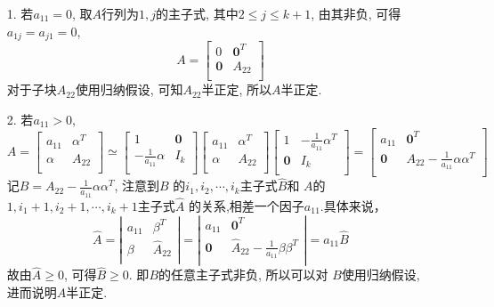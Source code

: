 \begin{enumerate}
	\item [1.] 若$a_{11} = 0$, 取$A$行列为$1,j$的主子式, 其中$2\le j \le k+1$,
	由其非负, 可得$a_{1j} = a_{j1} = 0$,
	\begin{equation}
	\nonumber
	A = \begin{bmatrix}
		0& \mathbf{0}^T\\
		\mathbf{0}& A_{22}\\
	\end{bmatrix}
	\end{equation}
	对于子块$A_{22}$使用归纳假设, 可知$A_{22}$半正定, 所以$A$半正定.
	\item [2.] 若$a_{11} > 0$,
	\begin{equation}
	\nonumber
	A=\begin{bmatrix}
		a_{11}& \alpha^T\\
		\alpha & A_{22}\\
	\end{bmatrix}
	\simeq 
	\begin{bmatrix}
		1& \mathbf{0}\\
		-\frac{1}{a_{11}}\alpha& I_{k}\\
	\end{bmatrix}
	\begin{bmatrix}
		a_{11}& \alpha^T\\
		\alpha & A_{22}\\
	\end{bmatrix}
	\begin{bmatrix}
		1& -\frac{1}{a_{11}}\alpha^T\\
		\mathbf{0}& I_{k}\\
	\end{bmatrix}
	=
	\begin{bmatrix}
		a_{11}& \mathbf{0}^T\\
		\mathbf{0} & A_{22} - \frac{1}{a_{11}}\alpha \alpha^T \\
	\end{bmatrix}
	\end{equation}
	记$B = A_{22} - \frac{1}{a_{11}}\alpha \alpha^T$,
	注意到$B$
	的$i_1,i_2,\cdots, i_k$主子式$\hat{B}$和
	$A$的$1,i_1+1,i_2+1,\cdots, i_k+1$主子式$\hat{A}$
	的关系,相差一个因子$a_{11}$.具体来说，
	\begin{equation}
	\nonumber
	\hat{A}=
	\left|
	\begin{array}{cc}
		a_{11}& \beta^T\\
		\beta& \hat{A}_{22}\\
	\end{array}
	\right|
	=
	\left|
	\begin{array}{cc}
		a_{11}& \mathbf{0}^T\\
		\mathbf{0} & \hat{A}_{22}-\frac{1}{a_{11}}\beta \beta^T \\
	\end{array}
	\right| = a_{11}\hat{B}
	\end{equation}
	故由$\hat{A}\ge 0$, 可得$\hat{B}\ge 0$.
	即$B$的任意主子式非负, 所以可以对
	$B$使用归纳假设, 进而说明$A$半正定.
\end{enumerate}
